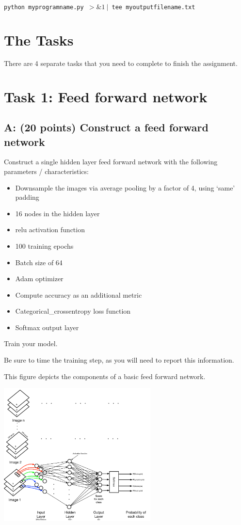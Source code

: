 \documentclass[11pt]{article}
\renewcommand\:{\colon} %
\begin{document}
 \texttt{python myprogramname.py $>\&1\ |$ tee myoutputfilename.txt}

\section*{The Tasks}
There are 4 separate tasks that you need to complete to finish the assignment.

\section{Task 1: Feed forward network}
\subsection{A: (20 points) Construct a feed forward network}

Construct a single hidden layer feed forward network with the following parameters / characteristics:

\begin{itemize}
\item Downsample the images via average pooling by a factor of 4, using `same' padding
\item 16 nodes in the hidden layer
\item relu activation function
\item 100 training epochs
\item Batch size of 64
\item Adam optimizer
\item Compute accuracy as an additional metric
\item Categorical\_crossentropy loss function
\item Softmax output layer
\end{itemize}

Train your model.

Be sure to time the training step, as you will need to report this information.

This figure depicts the components of a basic feed forward network.

\includegraphics[width=0.6\textwidth]{FF.pdf}
\end{document}
